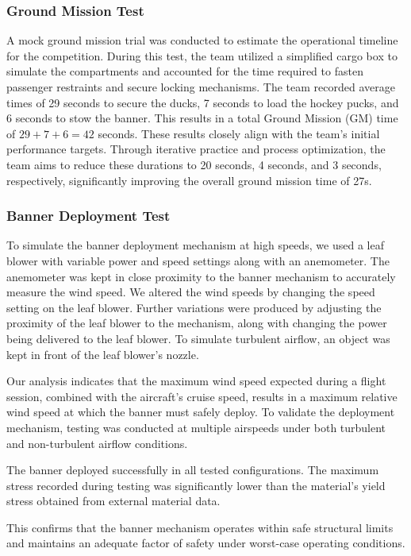 \documentclass[10pt, letterpaper]{article}
\begin{document}
\subsubsection{Ground Mission Test}
A mock ground mission trial was conducted to estimate the operational timeline for the competition. During this test, the team utilized a simplified cargo box to simulate the compartments and accounted for the time required to fasten passenger restraints and secure locking mechanisms. The team recorded average times of 29 seconds to secure the ducks, 7 seconds to load the hockey pucks, and 6 seconds to stow the banner. This results in a total Ground Mission (GM) time of $29 + 7 + 6 = 42$ seconds. These results closely align with the team's initial performance targets. Through iterative practice and process optimization, the team aims to reduce these durations to 20 seconds, 4 seconds, and 3 seconds, respectively, significantly improving the overall ground mission time of 27s. 

\subsubsection{Banner Deployment Test}
To simulate the banner deployment mechanism at high speeds, we used a leaf blower with variable power and speed settings along with an anemometer.  The anemometer was kept in close proximity to the banner mechanism to accurately measure the wind speed. We altered the wind speeds by changing the speed setting on the leaf blower. Further variations were produced by adjusting the proximity of the leaf blower to the mechanism, along with changing the power being delivered to the leaf blower. To simulate turbulent airflow, an object was kept in front of the leaf blower's nozzle.

Our analysis indicates that the maximum wind speed expected during a flight session, combined with the aircraft’s cruise speed, results in a maximum relative wind speed at which the banner must safely deploy. To validate the deployment mechanism, testing was conducted at multiple airspeeds under both turbulent and non-turbulent airflow conditions.

The banner deployed successfully in all tested configurations. The maximum stress recorded during testing was significantly lower than the material’s yield stress obtained from external material data.

This confirms that the banner mechanism operates within safe structural limits and maintains an adequate factor of safety under worst-case operating conditions.
\end{document}
